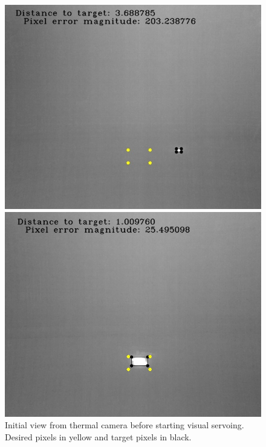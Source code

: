 \documentclass[conference]{IEEEtran}
\begin{document}

\begin{figure}%
    \begin{minipage}[t]{0.475\linewidth}
        \includegraphics[width=\linewidth]{Images/initial.jpg}
        \caption{Initial view from thermal camera before starting visual servoing. Desired pixels in yellow and target pixels in black.}
        \label{initial}
    \end{minipage}%
        \hfill%
    \begin{minipage}[t]{0.475\linewidth}
        \includegraphics[width=\linewidth]{Images/final.jpg}

\end{minipage}
\end{figure}
\end{document}
